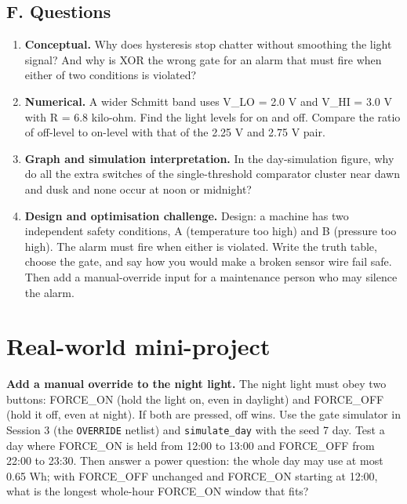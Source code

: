 \documentclass[11pt,a4paper]{article}
\begin{document}
\subsection*{F. Questions}
\begin{enumerate}[nosep]
\item \textbf{Conceptual.} Why does hysteresis stop chatter without smoothing the light signal? And why is XOR the wrong gate for an alarm that must fire when either of two conditions is violated?
\item \textbf{Numerical.} A wider Schmitt band uses V\_LO = 2.0 V and V\_HI = 3.0 V with R = 6.8 kilo-ohm. Find the light levels for on and off. Compare the ratio of off-level to on-level with that of the 2.25 V and 2.75 V pair.
\item \textbf{Graph and simulation interpretation.} In the day-simulation figure, why do all the extra switches of the single-threshold comparator cluster near dawn and dusk and none occur at noon or midnight?
\item \textbf{Design and optimisation challenge.} Design: a machine has two independent safety conditions, A (temperature too high) and B (pressure too high). The alarm must fire when either is violated. Write the truth table, choose the gate, and say how you would make a broken sensor wire fail safe. Then add a manual-override input for a maintenance person who may silence the alarm.
\end{enumerate}

\section{Real-world mini-project}
\textbf{Add a manual override to the night light.} The night light must obey two buttons: FORCE\_ON (hold the light on, even in daylight) and FORCE\_OFF (hold it off, even at night). If both are pressed, off wins. Use the gate simulator in Session 3 (the \texttt{OVERRIDE} netlist) and \texttt{simulate\_day} with the seed 7 day. Test a day where FORCE\_ON is held from 12:00 to 13:00 and FORCE\_OFF from 22:00 to 23:30. Then answer a power question: the whole day may use at most 0.65 Wh; with FORCE\_OFF unchanged and FORCE\_ON starting at 12:00, what is the longest whole-hour FORCE\_ON window that fits?
\end{document}
